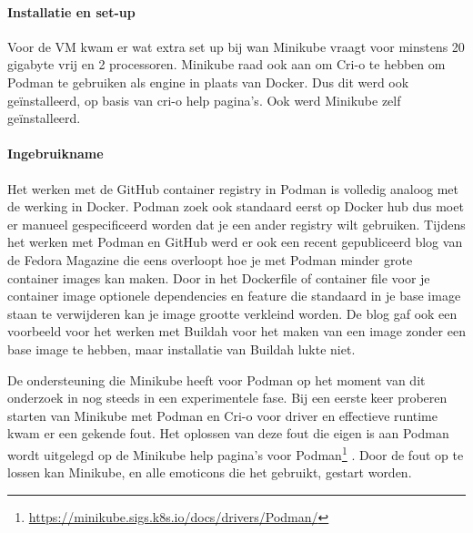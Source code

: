 \paragraph{Installatie en set-up}
Voor de VM kwam er wat extra set up bij wan Minikube vraagt voor minstens 20 gigabyte vrij en 2 processoren.
Minikube raad ook aan om Cri-o te hebben om Podman te gebruiken als engine in plaats van Docker. Dus dit werd ook geïnstalleerd, op basis van cri-o help pagina’s.  Ook werd Minikube zelf geïnstalleerd.

\paragraph{Ingebruikname}
Het werken met de GitHub container registry in Podman is volledig analoog met de werking in Docker. Podman zoek ook standaard eerst op Docker hub dus moet er manueel gespecificeerd worden dat je een ander registry wilt gebruiken. Tijdens het werken met Podman en GitHub werd er ook een recent gepubliceerd blog van de Fedora Magazine die eens overloopt hoe je met Podman minder grote container images kan maken. Door in het Dockerfile of container file voor je container image optionele dependencies en feature die standaard in je base image staan te verwijderen kan je image grootte verkleind worden. De blog gaf ook een voorbeeld voor het werken met Buildah voor het maken van een image zonder een base image te hebben, maar installatie van Buildah lukte niet.

De ondersteuning die Minikube heeft voor Podman op het moment van dit onderzoek in nog steeds in een experimentele fase. Bij een eerste keer proberen starten van Minikube met Podman en Cri-o voor driver en effectieve runtime kwam er een gekende fout. Het oplossen van deze fout die eigen is aan Podman wordt uitgelegd op de Minikube help pagina’s voor Podman\footnote{\url{https://minikube.sigs.k8s.io/docs/drivers/Podman/}} . Door de fout op te lossen kan Minikube, en alle emoticons die het gebruikt, gestart worden.

